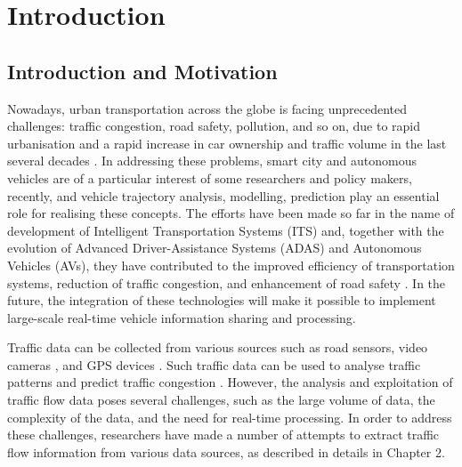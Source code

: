 \documentclass[11pt]{uonthesis}
\begin{document}
\chapter{Introduction}

\section{Introduction and Motivation}
Nowadays, urban transportation across the globe is facing unprecedented challenges: traffic congestion, road safety, pollution, and so on, due to rapid urbanisation and a rapid increase in car ownership and traffic volume in the last several decades \cite{congestion1}\cite{congestion2}. In addressing these problems, smart city and autonomous vehicles are of a particular interest of some researchers and policy makers, recently, and vehicle trajectory analysis, modelling, prediction play an essential role for realising these concepts. The efforts have been made so far in the name of development of Intelligent Transportation Systems (ITS) \cite{ITS} and, together with the evolution of Advanced Driver-Assistance Systems (ADAS) and Autonomous Vehicles (AVs), they have contributed to the improved efficiency of transportation systems, reduction of traffic congestion, and enhancement of road safety \cite{adas}. In the future, the integration of these technologies will make it possible to implement large-scale real-time vehicle information sharing and processing. 

Traffic data can be collected from various sources such as road sensors, video cameras \cite{ngsim}, and GPS devices \cite{Zhang20231124}. Such traffic data can be used to analyse traffic patterns \cite{trafficpattern} and predict traffic congestion \cite{GOMES2023200268}. However, the analysis and exploitation of traffic flow data poses several challenges, such as the large volume of data, the complexity of the data, and the need for real-time processing. In order to address these challenges, researchers have made a number of attempts to extract traffic flow information from various data sources, as described in details in Chapter 2.
\end{document}
